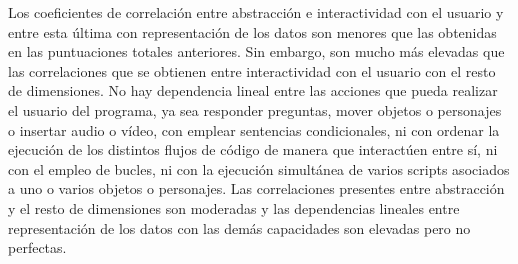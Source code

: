 \documentclass[a4paper, 12pt]{book}
\begin{document}
Los coeficientes de correlación entre abstracción e interactividad con el usuario y entre esta última con representación de los datos son menores que las obtenidas en las puntuaciones totales anteriores. Sin embargo, son mucho más elevadas que las correlaciones que se obtienen entre interactividad con el usuario con el resto de dimensiones. No hay dependencia lineal entre las acciones que pueda realizar el usuario del programa, ya sea responder preguntas, mover objetos o personajes o insertar audio o vídeo, con emplear sentencias condicionales, ni con ordenar la ejecución de los distintos flujos de código de manera que interactúen entre sí, ni con el empleo de bucles, ni con la ejecución simultánea de varios scripts asociados a uno o varios objetos o personajes. Las correlaciones presentes entre abstracción y el resto de dimensiones son moderadas y las dependencias lineales entre representación de los datos con las demás capacidades son elevadas pero no perfectas.%
\end{document}
